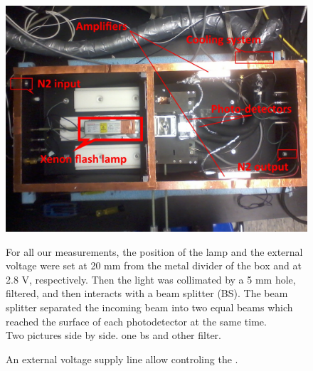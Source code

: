   \begin{figure}[!hbtp]
  \centering
  \includegraphics[totalheight=.35\textwidth,trim=0cm 7cm 0cm 2.5cm, clip=true,]{../Pictures/blabla/box.jpg}%
  \caption{An external voltage supply line allow controling the \xfl.}
  \label{fig:external_supply_line}

  For all our measurements, the position of the lamp and the external voltage were set at 20 mm from the metal divider of the box and at 2.8 V, respectively.
  Then the light was collimated by a 5 mm hole, filtered, and then interacts with a beam splitter (BS). The beam splitter separated the 
  incoming beam into two 
  equal beams which reached the surface of each photodetector at the same time. 
  \\
  Two pictures side by side. one bs and other filter.  
  

\end{figure}
